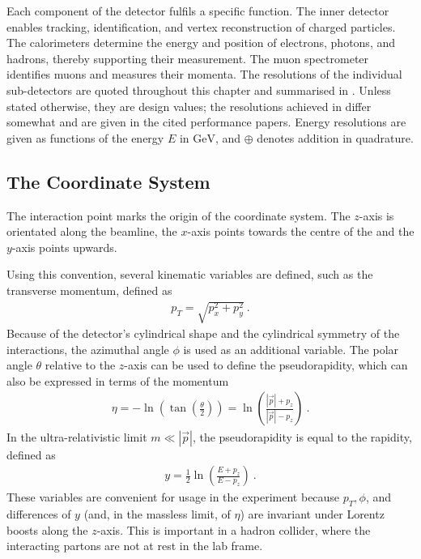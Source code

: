 Each component of the detector fulfils a specific function. The inner detector enables tracking, identification, and vertex reconstruction of charged particles. The calorimeters determine the energy and position of electrons, photons, and hadrons, thereby supporting their measurement. The muon spectrometer identifies muons and measures their momenta.
The resolutions of the individual sub-detectors are quoted throughout this chapter and summarised in . Unless stated otherwise, they are design values; the resolutions achieved in \LHCrunii differ somewhat and are given in the cited performance papers. Energy resolutions are given as functions of the energy $E$ in $\unit{\giga\electronvolt}$, and $\oplus$ denotes addition in quadrature.

\subsection{The Coordinate System}
The interaction point marks the origin of the \atlas coordinate system. The $z$-axis is orientated along the beamline, the $x$-axis points towards the centre of the \lhc and the $y$-axis points upwards.

Using this convention, several kinematic variables are defined, such as the transverse momentum, defined as 
\begin{align}
    p_T=\sqrt{p_x^2+p_y^2}~.
\end{align}
Because of the \atlas detector's cylindrical shape and the cylindrical symmetry of the interactions, the azimuthal angle $\phi$ is used as an additional variable. The polar angle $\theta$ relative to the $z$-axis can be used to define the pseudorapidity, which can also be expressed in terms of the momentum 
\begin{align}
    \eta=-\ln\left(\tan\left(\frac{\theta}{2}\right)\right)=\ln\left(\frac{|\vec   p|+p_z}{|\vec p|-p_z}\right)~.
\end{align}
In the ultra-relativistic limit $m\ll |\vec p|$, the pseudorapidity is equal to the rapidity, defined as 
\begin{align}
    y=\frac{1}{2}\ln\left(\frac{E+p_z}{E-p_z}\right)~.
\end{align}
These variables are convenient for usage in the \atlas experiment because $p_T,\phi$, and differences of $y$ (and, in the massless limit, of $\eta$) are invariant under Lorentz boosts along the $z$-axis. This is important in a hadron collider, where the interacting partons are not at rest in the lab frame.

